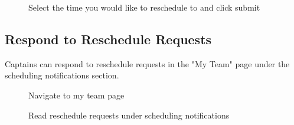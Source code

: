 \documentclass{article}
\begin{document}
\begin{figure}[H]
    \centering
    \caption{Select the time you would like to reschedule to and click submit}
\end{figure}

\subsection{Respond to Reschedule Requests}
Captains can respond to reschedule requests in the "My Team" page under the scheduling notifications section.

\begin{figure}[H]
    \centering
    \caption{Navigate to my team page}
\end{figure}

\begin{figure}[H]
    \centering
    \caption{Read reschedule requests under scheduling notifications}
\end{figure}
\end{document}
